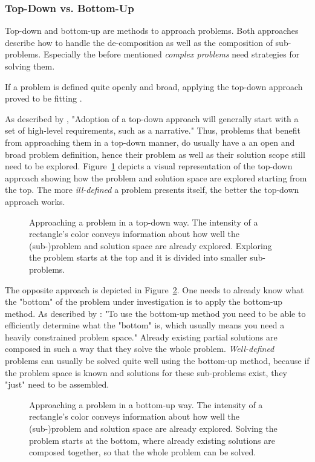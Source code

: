 \subsubsection{Top-Down vs. Bottom-Up}
Top-down and bottom-up are methods to approach problems.
Both approaches describe how to handle the de-composition as well as the composition of sub-problems.
Especially the before mentioned \emph{complex problems} need strategies for solving them.

If a problem is defined quite openly and broad, applying the top-down approach proved to be fitting \cite{kung_comparing_2013}.

As described by \citeauthor{kung_comparing_2013} \cite{kung_comparing_2013}, "Adoption of a top-down approach will generally start with a set of high-level requirements, such as a narrative."
Thus, problems that benefit from approaching them in a top-down manner, do usually have a an open and broad problem definition, hence their problem as well as their solution scope still need to be explored.
Figure~\ref{fig:top-down} depicts a visual representation of the top-down approach showing how the problem and solution space are explored starting from the top.
The more \emph{ill-defined} a problem presents itself, the better the top-down approach works.
%
\begin{figure}[h]
\centering
\hspace*{0.15\linewidth}

\caption{Approaching a problem in a top-down way. The intensity of a rectangle's color conveys information about how well the (sub-)problem and solution space are already explored. Exploring the problem starts at the top and it is divided into smaller sub-problems.}
\label{fig:top-down}
\end{figure}
%
The opposite approach is depicted in Figure~\cref{fig:bottom-up}.
One needs to already know what the "bottom" of the problem under investigation is to apply the bottom-up method.
As described by \citeauthor{jones_answer_2011} \cite{jones_answer_2011}: "To use the bottom-up method you need to be able to efficiently determine what the "bottom" is, which usually means you need a heavily constrained problem space."
Already existing partial solutions are composed in such a way that they solve the whole problem.
\emph{Well-defined} problems can usually be solved quite well using the bottom-up method, because if the problem space is known and solutions for these sub-problems exist, they "just" need to be assembled.
%
\begin{figure}[h]
\centering
\hspace*{0.15\linewidth}

\caption{Approaching a problem in a bottom-up way. The intensity of a rectangle's color conveys information about how well the (sub-)problem and solution space are already explored. Solving the problem starts at the bottom, where already existing solutions are composed together, so that the whole problem can be solved.}
\label{fig:bottom-up}
\end{figure}

